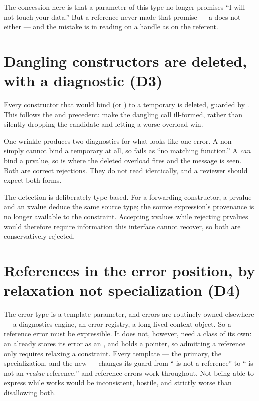 \documentclass[a4paper,10pt,oneside,openany,final,article]{memoir}
\begin{document}
The concession here is that a  parameter of this type no longer
promises ``I will not touch your data.'' But a reference never made that
promise --- a  does not either --- and the mistake is in
reading  on a handle as  on the referent.

\section{Dangling constructors are deleted, with a diagnostic (D3)}

Every constructor that would bind  (or ) to a temporary is
deleted, guarded by 
\cite{P2255R2}. This follows the  and  precedent: make
the dangling call ill-formed, rather than silently dropping the candidate and
letting a worse overload win.

One wrinkle produces two diagnostics for what looks like one error. A non-  simply cannot bind a
temporary at all, so  fails as ``no matching
function.'' A  \emph{can} bind a prvalue, so
 is where the deleted overload fires and the
message is seen. Both are correct rejections. They do not read identically, and
a reviewer should expect both forms.

The detection is deliberately type-based. For a forwarding constructor, a
prvalue and an xvalue deduce the same source type; the source expression's
provenance is no longer available to the constraint. Accepting xvalues while
rejecting prvalues would therefore require information this interface cannot
recover, so both are conservatively rejected.

\section{References in the error position, by relaxation not specialization (D4)}

The error type is a template parameter, and errors are routinely owned
elsewhere --- a diagnostics engine, an error registry, a long-lived context
object. So a reference error must be expressible. It does not, however, need a
class of its own: an  already stores its error as an
, and  holds a pointer, so
admitting a reference  only requires relaxing a constraint. Every  template --- the primary, the
 specialization, and the new  --- changes
its guard from `` is not a reference'' to `` is not an
\emph{rvalue} reference,'' and reference errors work throughout. Not being able
to express  while  works would
be inconsistent, hostile, and strictly worse than disallowing both.
\end{document}

